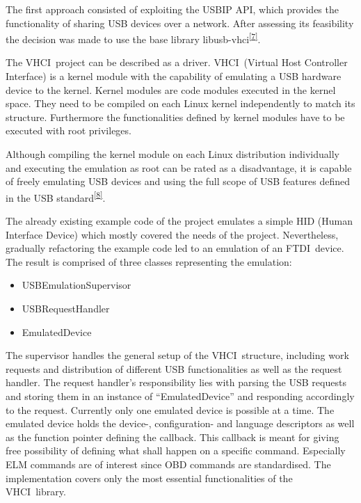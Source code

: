 {The first approach consisted of exploiting the USBIP API, which
provides the functionality of sharing USB devices over a network. After
assessing its feasibility the decision was made to use the base library
}{libusb-vhci}\textsuperscript{\protect\hyperlink{ftnt7}{{[}7{]}}}{.}

{The }{VHCI}{~project can be described as a driver.
}{VHCI}{~(Vir}{tu}{al Host Controller Interface) is a kernel module with
the capability of emulating a USB hardware device to the kernel. Kernel
modules are code modules executed in the kernel space. They need to be
compiled on each Linux kernel independently to match its structure.
Furthermore the functionalities defined by kernel modules have to be
executed with root privileges.}

{Although compiling the kernel module on each Linux distribution
individually and executing the emulation as root can be rated as a
disadvantage, it is capable of freely emulating USB devices and using
the full scope of USB features defined in the USB
standard}\textsuperscript{\protect\hyperlink{ftnt8}{{[}8{]}}}{. }

{The already existing example code of the project emulates a simple
}{HID }{(Human Interface Device) which mostly covered the needs of the
project. Nevertheless, gradually refactoring the example code led to an
emulation of an }{FTDI}{~device. The result is comprised of three
classes representing the emulation:}

\begin{itemize}
\tightlist
\item
  {USBEmulationSupervisor}
\item
  {USBRequestHandler}
\item
  {EmulatedDevice}
\end{itemize}

{The supervisor handles the general setup of the }{VHCI}{~structure,
including work requests and distribution of different USB
functionalities as well as the request handler. The request handler's
responsibility lies with parsing the USB requests and storing them in an
instance of ``EmulatedDevice'' and responding accordingly to the
request. Currently only one emulated device is possible at a time. The
emulated device holds the device-, configuration- and language
descriptors as well as the function pointer defining the callback. This
callback is meant for giving free possibility of defining what shall
happen on a specific command. Especially ELM commands are of interest
since OBD commands are standardised. The implementation covers only the
most essential functionalities of the }{VHCI}{~library}{.}

